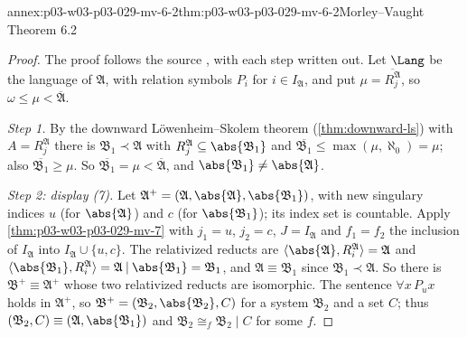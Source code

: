 \begin{annexitem}{annex:p03-w03-p03-029-mv-6-2}{thm:p03-w03-p03-029-mv-6-2}{Morley--Vaught Theorem 6.2}
\begin{proof}
The proof follows the source \cite[p.~55, proof of
Theorem~6.2]{MorleyVaught1962}, with each step written out. Let
\(\Lang\) be the language of \(\mathfrak A\), with relation symbols \(P_i\)
for \(i\in I_{\mathfrak A}\), and put \(\mu=\overline{R_j^{\mathfrak A}}\), so
\(\omega\leq\mu<\overline{\mathfrak A}\).

\emph{Step 1.} By the downward L\"owenheim--Skolem theorem
(\cref{thm:downward-ls}) with \(A=R_j^{\mathfrak A}\) there is
\(\mathfrak B_1\prec\mathfrak A\) with \(R_j^{\mathfrak
A}\subseteq\abs{\mathfrak B_1}\) and \(\overline{\mathfrak
B_1}\leq\max(\mu,\aleph_0)=\mu\); also \(\overline{\mathfrak B_1}\geq\mu\).
So \(\overline{\mathfrak B_1}=\mu<\overline{\mathfrak A}\), and
\(\abs{\mathfrak B_1}\neq\abs{\mathfrak A}\).

\emph{Step 2: display (7).} Let \(\mathfrak A^+=(\mathfrak
A,\abs{\mathfrak A},\abs{\mathfrak B_1})\), with new singulary indices
\(u\) (for \(\abs{\mathfrak A}\)) and \(c\) (for \(\abs{\mathfrak B_1}\)); its
index set is countable. Apply \cref{thm:p03-w03-p03-029-mv-7} with
\(j_1=u\), \(j_2=c\), \(J=I_{\mathfrak A}\) and \(f_1=f_2\) the inclusion
of \(I_{\mathfrak A}\) into \(I_{\mathfrak A}\cup\{u,c\}\). The relativized
reducts are \(\langle\abs{\mathfrak A},R_i^{\mathfrak A}\rangle=\mathfrak A\)
and \(\langle\abs{\mathfrak B_1},R_i^{\mathfrak A}\rangle=\mathfrak
A\mathbin{|}\abs{\mathfrak B_1}=\mathfrak B_1\), and \(\mathfrak
A\equiv\mathfrak B_1\) since \(\mathfrak B_1\prec\mathfrak A\). So there
is \(\mathfrak B^+\equiv\mathfrak A^+\) whose two relativized reducts are
isomorphic. The sentence \(\forall x\,P_ux\) holds in \(\mathfrak A^+\), so
\(\mathfrak B^+=(\mathfrak B_2,\abs{\mathfrak B_2},C)\) for a system
\(\mathfrak B_2\) and a set \(C\); thus \((\mathfrak B_2,C)\equiv(\mathfrak
A,\abs{\mathfrak B_1})\) and \(\mathfrak B_2\cong_f\mathfrak B_2\mathbin{|}C\)
for some \(f\).


\end{proof}
\end{annexitem}
